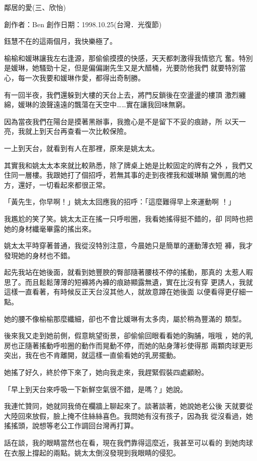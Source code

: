 鄰居的愛(三、欣怡)

創作者：Ben
創作日期：1998.10.25(台灣．光復節)


鈺慧不在的這兩個月，我快樂極了。

榆榆和媛琳讓我左右逢源，那偷偷摸摸的快感，天天都刺激得我情慾亢
奮。特別是媛琳，她騷勁十足，但是偏偏謝先生又是大醋桶，光要防他我們
就要特別當心，每一次我要和媛琳作愛，都得出奇制勝。

有一回半夜，我們還躲到大樓的天台上去，將門反鎖後在空盪盪的樓頂
激烈纏綿，媛琳的浪聲遠遠的飄蕩在天空中……實在讓我回味無窮。

因為當夜我們在陽台是摸著黑辦事，我擔心是不是留下不妥的痕跡，所
以天一亮，我就上到天台再查看一次比較保險。

一上到天台，就看到有人在那裡，原來是姚太太。

其實我和姚太太本來就比較熟悉，除了牌桌上她是比較固定的牌有之外
，我們又住同一層樓。我跟她打了個招呼，若無其事的走到夜裡我和媛琳顛
鸞倒鳳的地方，還好，一切看起來都很正常。

「黃先生，你早啊！」姚太太回應我的招呼：「這麼難得早上來運動啊
！」

我尷尬的笑了笑。姚太太正在搖一只呼啦圈，我看她搖得挺不錯的，卻
同時也把她的身材纖毫畢露的搖出來。

姚太太平時穿著普通，我從沒特別注意，今晨她只是簡單的運動薄衣短
褲，我才發現她的身材也不錯。

起先我站在她後面，就看到她豐腴的臀部隨著腰枝不停的搖動，那真的
太惹人暇思了。而且鬆鬆薄薄的短褲將內褲的痕跡顯露無遺，實在比沒有穿
更誘人，我就這樣一直看著，有時候反正天台沒其他人，就故意蹲在她後面
以便看得更仔細一點。

她的腰不像榆榆那麼纖細，卻也不會比媛琳有太多肉，屬於稍為豐滿的
類型。

後來我又走到她前側，假意眺望街景，卻偷偷回眼看看她的胸脯，哦哦
，她的乳房也正隨著搖動呼啦圈的動作而晃動不停，而她的貼身薄衫使得那
兩顆肉球更形突出，我在也不肯離開，就這樣一直偷看她的乳房擺動。

她搖了好久，終於停下來了，她向我走來，我趕緊假裝四處顧盼。

「早上到天台來呼吸一下新鮮空氣很不錯，是嗎？」她說。

我連忙贊同，她就同我倚在欄牆上聊起來了。談著談著，她說她老公後
天就要從大陸回來放假，臉上掩不住絲絲喜色。我問她有沒有孩子，因為我
從沒看過，她搖搖頭，說想等老公工作調回台灣再打算。

話在談，我的眼睛當然也在看，現在我們靠得這麼近，我甚至可以看的
到她肉球在衣服上撐起的兩點。姚太太倒沒發現到我眼睛的侵犯。


